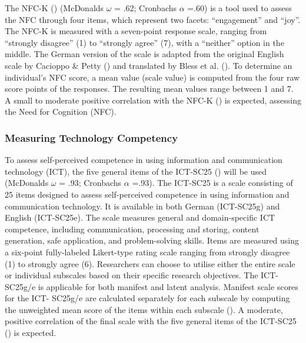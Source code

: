 \documentclass[
  12pt,
  a4paper,
  twoside]{article}
\begin{document}
The NFC-K () (McDonalds \(\omega\) = .62; Cronbachs \(\alpha\) =.60) is a tool used to assess the
NFC through four items, which represent two facets: ``engagement'' and ``joy''. The
NFC-K is measured with a seven-point response scale, ranging from ``strongly
disagree'' (1) to ``strongly agree'' (7), with a ``neither'' option in the middle. The
German version of the scale is adapted from the original English scale by Cacioppo \& Petty () and translated by Bless et al. (). To determine an individual's NFC score, a mean value
(scale value) is computed from the four raw score points of the responses. The
resulting mean values range between 1 and 7. A small to moderate positive correlation with the NFC-K () is expected, assessing the Need for Cognition (NFC).

\subsubsection{Measuring Technology Competency}\label{measuring-technology-competency}

To assess self-perceived competence in using information and
communication technology (ICT), the five general items of the ICT-SC25 () will be used (McDonalds \(\omega\) = .93; Cronbachs \(\alpha\) =.93). The ICT-SC25 is a scale consisting of 25 items designed to
assess self-perceived competence in using information and communication
technology. It is available in both German (ICT-SC25g) and English (ICT-SC25e). The
scale measures general and domain-specific ICT competence, including
communication, processing and storing, content generation, safe application, and
problem-solving skills. Items are measured using a six-point fully-labeled Likert-type
rating scale ranging from strongly disagree (1) to strongly agree (6). Researchers can choose to
utilise either the entire scale or individual subscales based on their specific research objectives. The ICT-SC25g/e
is applicable for both manifest and latent analysis. Manifest scale scores for the ICT-
SC25g/e are calculated separately for each subscale by computing the unweighted
mean score of the items within each subscale (). A moderate, positive correlation of the final scale with the five general items of the ICT-SC25 () is expected.
\end{document}
